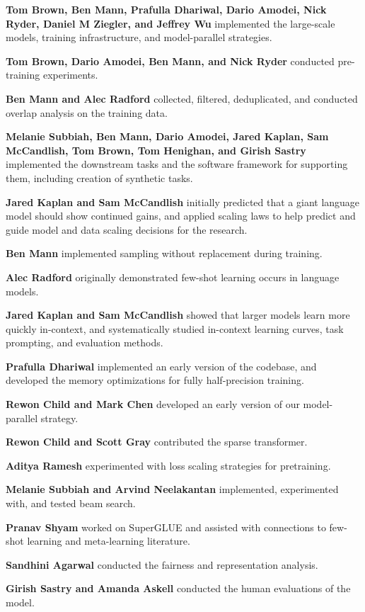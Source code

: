 \label{sec:contributions}
\textbf{Tom Brown, Ben Mann, Prafulla Dhariwal, Dario Amodei, Nick Ryder, Daniel M Ziegler, and Jeffrey Wu} implemented the large-scale models, training infrastructure, and model-parallel strategies.

\textbf{Tom Brown, Dario Amodei, Ben Mann, and Nick Ryder} conducted pre-training experiments.

\textbf{Ben Mann and Alec Radford} collected, filtered, deduplicated, and conducted overlap analysis on the training data.

\textbf{Melanie Subbiah, Ben Mann, Dario Amodei, Jared Kaplan, Sam McCandlish, Tom Brown, Tom Henighan, and Girish Sastry} implemented the downstream tasks and the software framework for supporting them, including creation of synthetic tasks.

\textbf{Jared Kaplan and Sam McCandlish} initially predicted that a giant language model should show continued gains, and applied scaling laws to help predict and guide model and data scaling decisions for the research.

\textbf{Ben Mann} implemented sampling without replacement during training.

\textbf{Alec Radford} originally demonstrated few-shot learning occurs in language models.

\textbf{Jared Kaplan and Sam McCandlish} showed that larger models learn more quickly in-context, and systematically studied in-context learning curves, task prompting, and evaluation methods.

\textbf{Prafulla Dhariwal} implemented an early version of the codebase, and developed the memory optimizations for fully half-precision training.

\textbf{Rewon Child and Mark Chen} developed an early version of our model-parallel strategy.

\textbf{Rewon Child and Scott Gray} contributed the sparse transformer.

\textbf{Aditya Ramesh} experimented with loss scaling strategies for pretraining.

\textbf{Melanie Subbiah and Arvind Neelakantan} implemented, experimented with, and tested beam search.

\textbf{Pranav Shyam} worked on SuperGLUE and assisted with connections to few-shot learning and meta-learning literature.

\textbf{Sandhini Agarwal} conducted the fairness and representation analysis.

\textbf{Girish Sastry and Amanda Askell} conducted the human evaluations of the model.

